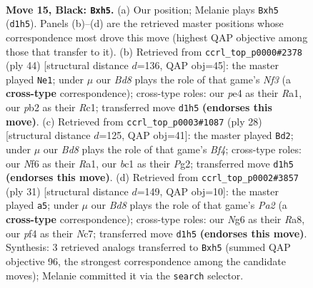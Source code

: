 \documentclass[11pt]{article}
\begin{document}
\clearpage

\begin{figure}[p]\centering
\begin{subfigure}{0.46\textwidth}\centering
\resizebox{\linewidth}{!}{%
\newchessgame
\chessboard[
  setfen={r2N1rk1/2p1bppp/p2p1nn1/7P/1pP1PP2/1B6/PP4P1/RNBbR1K1 b - - 0 15},
  showmover=false,
  pgfstyle=straightmove, color=movearrow, markmove={d1-h5}
]}
\caption{}
\end{subfigure}\hfill
\begin{subfigure}{0.46\textwidth}\centering
\resizebox{\linewidth}{!}{%
\newchessgame
\chessboard[
  setfen={1r1r4/pp2bk1p/1np1pp2/1nN3pb/1P1P4/2B1PNP1/1P3PBP/R1R3K1 w - - 0 23},
  showmover=false,
  pgfstyle=straightmove, color=movearrow, markmove={f3-e1}
]}
\caption{}
\end{subfigure}
\\[4pt]
\begin{subfigure}{0.46\textwidth}\centering
\resizebox{\linewidth}{!}{%
\newchessgame
\chessboard[
  setfen={r3kb1r/1pp2pp1/2p1b2p/p2nP3/P2N1B2/2N4P/1PP2PP1/R2R2K1 w - - 4 15},
  showmover=false,
  pgfstyle=straightmove, color=movearrow, markmove={f4-d2}
]}
\caption{}
\end{subfigure}\hfill
\begin{subfigure}{0.46\textwidth}\centering
\resizebox{\linewidth}{!}{%
\newchessgame
\chessboard[
  setfen={rr4k1/p1nbppbp/3p1np1/8/1p1PPNP1/4BP2/PP5P/1K1R1BNR b - - 1 16},
  showmover=false,
  pgfstyle=straightmove, color=movearrow, markmove={a7-a5}
]}
\caption{}
\end{subfigure}
\caption{\textbf{Move 15, Black: \texttt{Bxh5}.} (a) Our position; Melanie plays \texttt{Bxh5} (\texttt{d1h5}). Panels (b)--(d) are the retrieved master positions whose correspondence most drove this move (highest QAP objective among those that transfer to it). (b) Retrieved from \texttt{ccrl\_top\_p0000\#2378} (ply 44) [structural distance $d$=136, QAP obj=45]: the master played \texttt{Ne1}; under $\mu$ our \emph{Bd8} plays the role of that game's \emph{Nf3} (a \textbf{cross-type} correspondence); cross-type roles: our \emph{p}e4 as their \emph{R}a1, our \emph{p}b2 as their \emph{R}c1; transferred move \texttt{d1h5} \textbf{(endorses this move)}. (c) Retrieved from \texttt{ccrl\_top\_p0003\#1087} (ply 28) [structural distance $d$=125, QAP obj=41]: the master played \texttt{Bd2}; under $\mu$ our \emph{Bd8} plays the role of that game's \emph{Bf4}; cross-type roles: our \emph{N}f6 as their \emph{R}a1, our \emph{b}c1 as their \emph{P}g2; transferred move \texttt{d1h5} \textbf{(endorses this move)}. (d) Retrieved from \texttt{ccrl\_top\_p0002\#3857} (ply 31) [structural distance $d$=149, QAP obj=10]: the master played \texttt{a5}; under $\mu$ our \emph{Bd8} plays the role of that game's \emph{Pa2} (a \textbf{cross-type} correspondence); cross-type roles: our \emph{N}g6 as their \emph{R}a8, our \emph{p}f4 as their \emph{N}c7; transferred move \texttt{d1h5} \textbf{(endorses this move)}. Synthesis: 3 retrieved analogs transferred to \texttt{Bxh5} (summed QAP objective 96, the strongest correspondence among the candidate moves); Melanie committed it via the \texttt{search} selector.}
\label{fig:thought-m29}
\end{figure}
\end{document}
